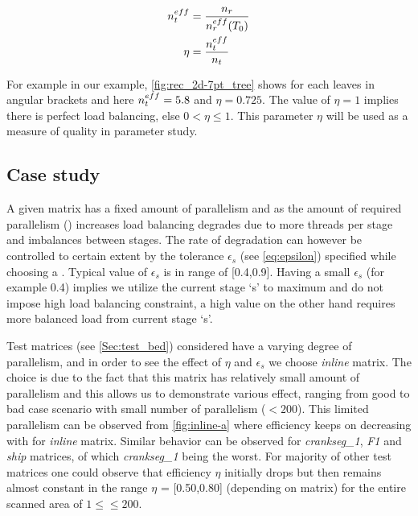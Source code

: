 \begin{align}
	\threadEffMath &= \frac{\nrowsMath}{\nrowsEffMath(T_0)} \\
	\eta &= \frac{\threadEffMath}{\nthreadsMath} \label{eq:eta}
\end{align}

For example in our \STEX example, \cref{fig:rec_2d-7pt_tree} shows \nrowsEff for each leaves in angular brackets and here $n_{t}^{eff} = 5.8$ and $\eta = 0.725$. The value of $\eta = 1$ implies there is perfect load balancing, else $0 < \eta \leq 1$. This parameter $\eta$ will be used as a measure of quality in parameter study.

\subsection{Case study}
A given matrix has a fixed amount of parallelism and as the amount of required parallelism (\nthreads) increases load balancing degrades due to more threads per stage and imbalances between stages. The rate of degradation can however be controlled to certain extent by the tolerance $\epsilon_s$ (see \cref{eq:epsilon}) specified while choosing a \levelGroup. Typical value of $\epsilon_s$ is in range of [0.4,0.9]. Having a small $\epsilon_s$ (for example 0.4) implies we utilize the current stage `s' to maximum and do not impose high load balancing constraint, a high value on the other hand requires more balanced load from current stage `s'. 

Test matrices (see \cref{Sec:test_bed}) considered have a varying degree of parallelism, and in order to see the effect of $\eta$ and $\epsilon_s$ we choose \emph{inline} matrix. The choice is due to the fact that this matrix has relatively small amount of parallelism and this allows us to demonstrate various effect, ranging from good to bad case scenario with small number of parallelism (\nthreads$ < 200$). This limited parallelism can be observed from \cref{fig:inline-a} 
where efficiency keeps on decreasing with \nthreads for \emph{inline} matrix. Similar behavior can be observed for \emph{crankseg\_1}, \emph{F1} and \emph{ship} matrices, of which \emph{crankseg\_1} being the worst. For majority of other test matrices one could observe that efficiency $\eta$ initially drops but then remains almost constant in the range $\eta$ = [0.50,0.80] (depending on matrix) for the entire scanned area of $1 \leq $\nthreads$ \leq 200$.

